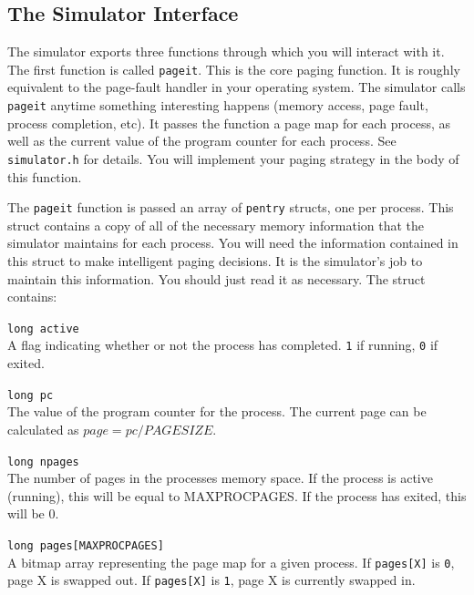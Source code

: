 \documentclass[12pt]{article}
\newenvironment{packed_desc}{
\begin{description}
  \setlength{\itemsep}{1pt}
  \setlength{\parskip}{0pt}
  \setlength{\parsep}{0pt}
}{\end{description}}
\begin{document}
\subsection {The Simulator Interface}

The simulator exports three functions through which you will interact
with it. The first function is called \texttt{pageit}. This is the
core paging function. It is roughly equivalent to the page-fault handler in
your operating system. The simulator calls \texttt{pageit} anytime
something interesting happens (memory access, page fault, process
completion, etc). It passes the function a page map for each process,
as well as the current value of the program counter for each
process. See \texttt{simulator.h} for details. You will
implement your paging strategy in the body of this function.

The \texttt{pageit} function is passed an array of \texttt{pentry}
structs, one per process. This struct contains a copy of all of the
necessary memory information that the simulator maintains for each
process. You will need the information contained in this struct to make
intelligent paging decisions. It is the simulator's job to maintain
this information. You should just read it as necessary. The struct
contains:

\begin{packed_desc}
\item[\texttt{long active}] \hfill \\
  A flag indicating whether or not the
  process has completed. \texttt{1} if running, \texttt{0} if exited.
\item[\texttt{long pc}] \hfill \\
  The value of the program counter for the
  process. The current page can be calculated as $page = pc / PAGESIZE$.
\item[\texttt{long npages}] \hfill \\
  The number of pages in the processes
  memory space. If the process is active (running), this will be equal
  to MAXPROCPAGES. If the process has exited, this will be 0.
\item[\texttt{long pages[MAXPROCPAGES]}] \hfill \\
  A bitmap array representing the
  page map for a given process. If \texttt{pages[X]} is
  \texttt{0}, page X
  is swapped out. If \texttt{pages[X]} is \texttt{1},
  page X is currently swapped in.
\end{packed_desc}
\end{document}
